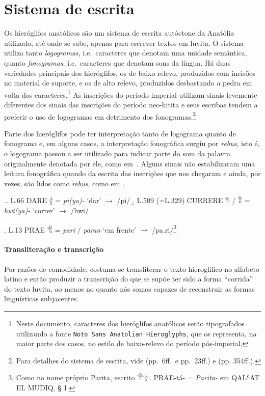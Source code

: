 
\section{Sistema de escrita}

Os hieróglifos anatólicos são um sistema de escrita autóctone da Anatólia
utilizado, até onde se sabe, apenas para escrever textos em luvita.
O sistema utiliza tanto \emph{logogramas}, i.e.\ caracteres que denotam uma
unidade semântica, quanto \emph{fonogramas}, i.e.\ caracteres que denotam sons da
língua.
Há duas variedades principais dos hieróglifos, os de baixo relevo, produzidos
com incisões no material de suporte, e os de alto relevo, produzidos
desbastando a pedra em volta dos caracteres.\footnote{Neste documento,
	caracteres dos hieróglifos anatólicos serão tipografados utilizando a fonte
		{\tiny\texttt{Noto Sans Anatolian Hieroglyphs}}, que os representa, na
	maior parte dos casos, no estilo de
	baixo-relevo do período pós\hyp{}imperial.}
As inscrições do período imperial utilizam sinais levemente diferentes dos
sinais das inscrições do período neo-hitita e seus escribas tendem a preferir
o uso de logogramas em detrimento dos fonogramas.\footnote{%
	Para detalhes do sistema de escrita, vide
	 (pp.\ 6ff.\ e pp.\ 23ff.) e  (pp. 354ff.).
}


Parte dos hieróglifos pode ter interpretação tanto de logograma quanto de
fonograma e, em alguns casos, a interpretação fonográfica surgiu por
\emph{rebus}, isto é, o logograma passou a ser utilizado para indicar parte do
som da palavra originalmente denotada por ele, como em~\Next.
Alguns sinais não estabilizaram uma leitura fonográfica quando da escrita das
inscrições que nos chegaram e ainda, por vezes, são lidos como \emph{rebus},
como em~\NNext.

\ex.\a. L.66 DARE 𔑈 = \emph{pi{(ya)}-} `dar' $\rightarrow$ /pi/
\b. L.509 (=L.329) CURRERE 𔘰 \slash{} 𔕰 = \emph{hwi{(ya)}-} `correr' $\rightarrow$
/hwi/

\ex. L.13 PRAE 𔐎 = \emph{pari} \slash{} \emph{paran} `em frente' $\rightarrow$
/pa.ri/\footnote{Como no nome próprio Parita, escrito 𔐎𔐞 PRAE-tá- =
	\emph{Parita-} em QALʿAT EL MUDIQ, § 1.}

\paragraph{Transliteração e transcrição}
Por razões de comodidade, costuma-se transliterar o texto hieroglífico no
alfabeto latino e então produzir a transcrição do que se supõe ter sido a
forma ``corrida'' do texto luvita, ao menos no quanto nós somos capazes de
reconstruir as formas linguísticas subjacentes.


